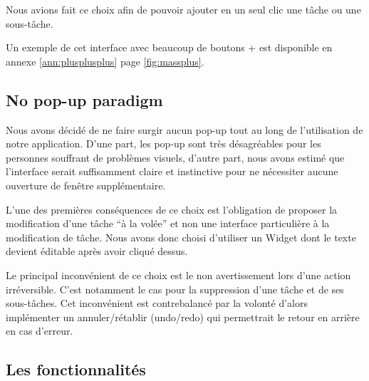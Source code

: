 \documentclass[11pt]{article}
\begin{document}
Nous avions fait ce choix afin de pouvoir ajouter en un seul clic une
tâche ou une sous-tâche.

Un exemple de cet interface avec beaucoup de boutons + est disponible
en annexe \ref{ann:plusplusplus} page \ref{fig:massplus}.




\subsection{No pop-up paradigm}

Nous avons décidé de ne faire surgir aucun pop-up tout au long de
l'utilisation de notre application. D'une part, les pop-up sont très
désagréables pour les personnes souffrant de problèmes visuels,
d'autre part, nous avons estimé que l'interface serait suffisamment
claire et instinctive pour ne nécessiter aucune ouverture de fenêtre
supplémentaire.

L'une des premières conséquences de ce choix est l'obligation de
proposer la modification d'une tâche ``à la volée'' et non une
interface particulière à la modification de tâche. Nous avons donc
choisi d'utiliser un Widget dont le texte devient éditable après avoir
cliqué dessus.

Le principal inconvénient de ce choix est le non avertissement lors
d'une action irréversible. C'est notamment le cas pour la suppression
d'une tâche et de ses sous-tâches. Cet inconvénient est contrebalancé
par la volonté d'alors implémenter un annuler/rétablir (undo/redo) qui
permettrait le retour en arrière en cas d'erreur.



\subsection{Les fonctionnalités}
\end{document}
